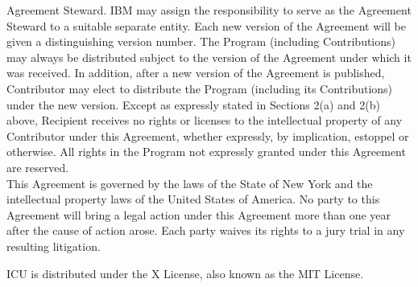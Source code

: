 {Agreement Steward. IBM may assign the responsibility to serve as the
Agreement Steward to a suitable separate entity. Each new version of
the Agreement will be given a distinguishing version number. The
Program (including Contributions) may always be distributed subject to
the version of the Agreement under which it was received. In addition,
after a new version of the Agreement is published, Contributor may
elect to distribute the Program (including its Contributions) under
the new version. Except as expressly stated in Sections 2(a) and 2(b)
above, Recipient receives no rights or licenses to the intellectual
property of any Contributor under this Agreement, whether expressly,
by implication, estoppel or otherwise. All rights in the Program not
expressly granted under this Agreement are reserved.
\\[4pt]
This Agreement is governed by the laws of the State of New York and
the intellectual property laws of the United States of America. No
party to this Agreement will bring a legal action under this Agreement
more than one year after the cause of action arose. Each party waives
its rights to a jury trial in any resulting litigation.
}



\setlength{\baselineskip}{\oldbaselineskip}
\noindent
ICU is distributed under the X License, also known as the MIT License.
\\

